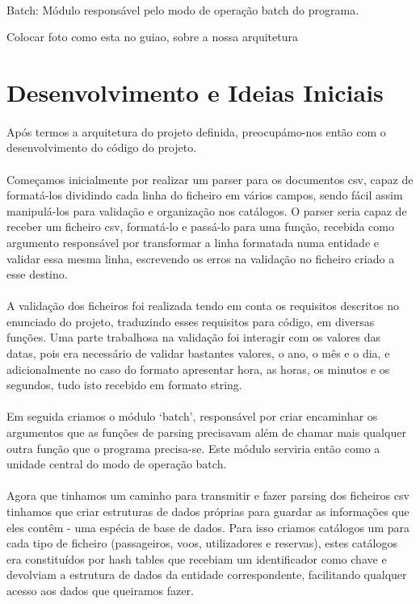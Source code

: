 \documentclass{article}
\begin{document}
\paragraph{}Batch: Módulo responsável pelo modo de operação batch do programa. 


Colocar foto como esta no guiao, sobre a nossa arquitetura
\section{Desenvolvimento e Ideias Iniciais}
\paragraph{}Após termos a arquitetura do projeto definida, preocupámo-nos então com o desenvolvimento do código do projeto. 
\paragraph{}Começamos inicialmente por realizar um parser para os documentos csv, capaz de formatá-los dividindo cada linha do ficheiro em vários campos, sendo fácil assim manipulá-los para validação e organização nos catálogos. O parser seria capaz de receber um ficheiro csv, formatá-lo e passá-lo para uma função, recebida como argumento responsável por transformar a linha formatada numa entidade e validar essa mesma linha, escrevendo os erros na validação no ficheiro criado a esse destino.   
\paragraph{}A validação dos ficheiros foi realizada tendo em conta os requisitos descritos no enunciado do projeto, traduzindo esses requisitos para código, em diversas funções. Uma parte trabalhosa na validação foi interagir com os valores das datas, pois era necessário de validar bastantes valores, o ano, o mês e o dia, e adicionalmente no caso do formato apresentar hora, as horas, os minutos e os segundos, tudo isto recebido em formato string. 
\paragraph{}Em seguida criamos o módulo ‘batch’, responsável por criar encaminhar os argumentos que as funções de parsing precisavam além de chamar mais qualquer outra função que o programa precisa-se. Este módulo serviria então como a unidade central do modo de operação batch.  
\paragraph{}Agora que tinhamos um caminho para transmitir e fazer parsing dos ficheiros csv tinhamos que criar estruturas de dados próprias para guardar as informações que eles contêm - uma espécia de base de dados.  Para isso criamos catálogos um para cada tipo de ficheiro (passageiros, voos, utilizadores e reservas), estes catálogos era constituídos por hash tables que recebiam um identificador como chave e devolviam a estrutura de dados da entidade correspondente, facilitando qualquer acesso aos dados que queiramos fazer. 
\end{document}
